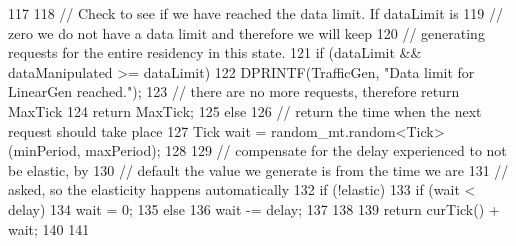 \begin{DoxyCode}
117 {
118     // Check to see if we have reached the data limit. If dataLimit is
119     // zero we do not have a data limit and therefore we will keep
120     // generating requests for the entire residency in this state.
121     if (dataLimit && dataManipulated >= dataLimit) {
122         DPRINTF(TrafficGen, "Data limit for LinearGen reached.\n");
123         // there are no more requests, therefore return MaxTick
124         return MaxTick;
125     } else {
126         // return the time when the next request should take place
127         Tick wait = random_mt.random<Tick>(minPeriod, maxPeriod);
128 
129         // compensate for the delay experienced to not be elastic, by
130         // default the value we generate is from the time we are
131         // asked, so the elasticity happens automatically
132         if (!elastic) {
133             if (wait < delay)
134                 wait = 0;
135             else
136                 wait -= delay;
137         }
138 
139         return curTick() + wait;
140     }
141 }
\end{DoxyCode}


